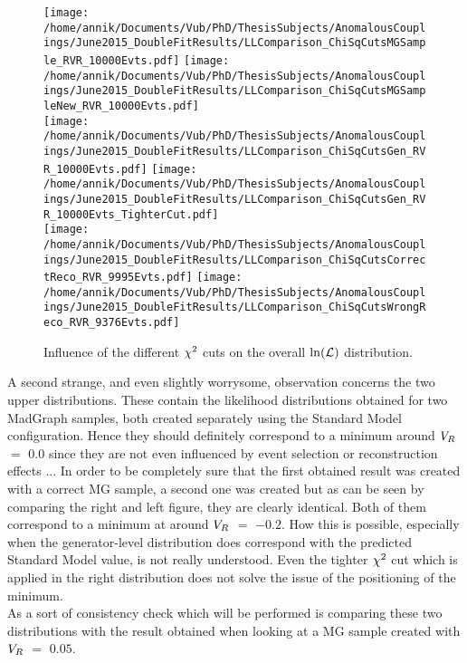 \begin{figure}[h!t]
 \centering
 \texttt{[image: /home/annik/Documents/Vub/PhD/ThesisSubjects/AnomalousCouplings/June2015\_DoubleFitResults/LLComparison\_ChiSqCutsMGSample\_RVR\_10000Evts.pdf]}
 \texttt{[image: /home/annik/Documents/Vub/PhD/ThesisSubjects/AnomalousCouplings/June2015\_DoubleFitResults/LLComparison\_ChiSqCutsMGSampleNew\_RVR\_10000Evts.pdf]}\\
 \texttt{[image: /home/annik/Documents/Vub/PhD/ThesisSubjects/AnomalousCouplings/June2015\_DoubleFitResults/LLComparison\_ChiSqCutsGen\_RVR\_10000Evts.pdf]}
 \texttt{[image: /home/annik/Documents/Vub/PhD/ThesisSubjects/AnomalousCouplings/June2015\_DoubleFitResults/LLComparison\_ChiSqCutsGen\_RVR\_10000Evts\_TighterCut.pdf]}\\
 \texttt{[image: /home/annik/Documents/Vub/PhD/ThesisSubjects/AnomalousCouplings/June2015\_DoubleFitResults/LLComparison\_ChiSqCutsCorrectReco\_RVR\_9995Evts.pdf]}
 \texttt{[image: /home/annik/Documents/Vub/PhD/ThesisSubjects/AnomalousCouplings/June2015\_DoubleFitResults/LLComparison\_ChiSqCutsWrongReco\_RVR\_9376Evts.pdf]}
 \caption{Influence of the different $\chi^{2}$ cuts on the overall $\ln(\mathcal{L})$ distribution.}
 \label{fig::ChiSqOnLL}
\end{figure}

A second strange, and even slightly worrysome, observation concerns the two upper distributions. These contain the likelihood distributions obtained for two MadGraph samples, both created separately using the Standard Model configuration. Hence they should definitely correspond to a minimum around $V_{R}$ $=$ $0.0$ since they are not even influenced by event selection or reconstruction effects ... In order to be completely sure that the first obtained result was created with a correct MG sample, a second one was created but as can be seen by comparing the right and left figure, they are clearly identical. Both of them correspond to a minimum at around $V_{R}$ $=$ $-0.2$. How this is possible, especially when the generator-level distribution does correspond with the predicted Standard Model value, is not really understood. Even the tighter $\chi^{2}$ cut which is applied in the right distribution does not solve the issue of the positioning of the minimum.\\
As a sort of consistency check which will be performed is comparing these two distributions with the result obtained when looking at a MG sample created with $V_{R}$ $=$ $0.05$. 

